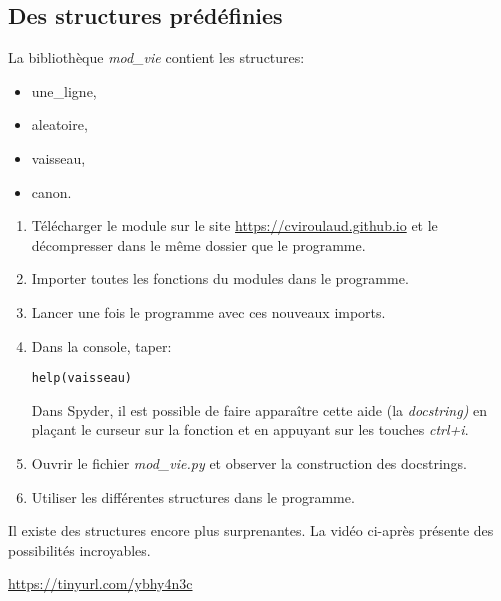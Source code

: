 \documentclass[a4paper,11pt]{article}
\begin{document}
\begin{Form}
\subsection{Des structures prédéfinies}
La bibliothèque \emph{mod\_vie} contient les structures:
\begin{itemize}
\item une\_ligne,
\item aleatoire,
\item vaisseau,
\item canon.
\end{itemize}
\begin{activite}
\begin{enumerate}
\item Télécharger le module sur le site \url{https://cviroulaud.github.io} et le décompresser dans le même dossier que le programme.
\item Importer toutes les fonctions du modules dans le programme.
\item Lancer une fois le programme avec ces nouveaux imports.
\item Dans la console, taper:
\begin{lstlisting}
help(vaisseau)
\end{lstlisting}
Dans Spyder, il est possible de faire apparaître cette aide (la \emph{docstring)} en plaçant le curseur sur la fonction et en appuyant sur les touches \emph{ctrl+i}.
\item Ouvrir le fichier \emph{mod\_vie.py} et observer la construction des docstrings.
\item Utiliser les différentes structures dans le programme.
\end{enumerate}
\end{activite}
Il existe des structures encore plus surprenantes. La vidéo ci-après présente des possibilités incroyables.
\begin{center}
\url{https://tinyurl.com/ybhy4n3c}
\end{center}
\end{Form}
\end{document}
